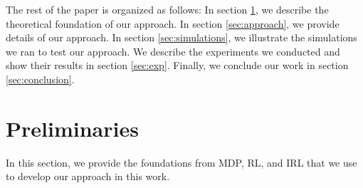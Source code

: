 \documentclass[letterpaper, 10 pt, conference]{ieeeconf}  %
\begin{document}
The rest of the paper is organized as follows: In section \ref{sec:Preliminaries}, we describe the theoretical foundation of our approach. In section \ref{sec:approach}, we provide details of our approach. In section \ref{sec:simulations}, we illustrate the simulations we ran to test our approach. We describe the experiments we conducted and show their results in section \ref{sec:exp}. Finally, we conclude our work in section \ref{sec:conclusion}.

\section{Preliminaries}\label{sec:Preliminaries}
In this section, we provide the foundations from MDP, RL, and IRL that we use to develop our approach in this work.
\end{document}
